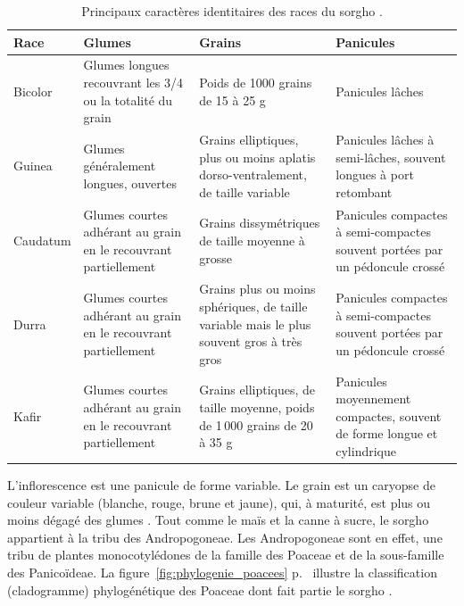 \documentclass[a4paper,11pt]{article}
\begin{document}
\begin{table}
  \begin{footnotesize}
    \begin{center}
      \begin{tabular}{lb{3cm}b{3cm}b{3cm}}
        \textbf{Race} & \textbf{Glumes}  & \textbf{Grains}  & \textbf{Panicules} \\ \hline
        Bicolor & Glumes longues recouvrant les 3/4 ou la totalité du grain  & Poids de 1000 grains de 15 à 25 g & Panicules lâches \\ \hline
        Guinea & Glumes généralement longues, ouvertes & Grains elliptiques, plus ou moins aplatis dorso-ventralement, de taille variable & Panicules lâches à semi-lâches, souvent longues à port retombant \\ \hline
        Caudatum & Glumes courtes adhérant au grain en le recouvrant partiellement & Grains dissymétriques de taille moyenne à grosse & Panicules compactes à semi-compactes souvent portées par un pédoncule crossé \\ \hline
        Durra & Glumes courtes adhérant au grain en le recouvrant partiellement & Grains plus ou moins sphériques, de taille variable mais le plus souvent gros à très gros & Panicules compactes à semi-compactes souvent portées par un pédoncule crossé \\ \hline
        Kafir & Glumes courtes adhérant au grain en le recouvrant partiellement & Grains elliptiques, de taille moyenne, poids de 1\,000 grains de 20 à 35 g & Panicules moyennement compactes, souvent de forme longue et cylindrique \\ 
      \end{tabular}
      \caption{Principaux caractères identitaires des races du sorgho \protect\cite{Chantereau_2013}.}
      \label{tableau:Chantereau_2013}
    \end{center}
  \end{footnotesize}
\end{table}

L'inflorescence est une panicule de forme variable. Le grain est un
caryopse de couleur variable (blanche, rouge, brune et jaune), qui, à
maturité, est plus ou moins dégagé des glumes
\cite{SaintClair_1989,Chantereau_1991}. Tout comme le maïs et la canne
à sucre, le sorgho appartient à la tribu des Andropogoneae. Les
Andropogoneae sont en effet, une tribu de plantes monocotylédones de
la famille des Poaceae et de la sous-famille des Panicoïdeae. La
figure~\ref{fig:phylogenie_poacees}
p.~\pageref{fig:phylogenie_poacees} illustre la classification
(cladogramme) phylogénétique des Poaceae dont fait partie le sorgho
\cite{Paquet_2005}.
\end{document}
